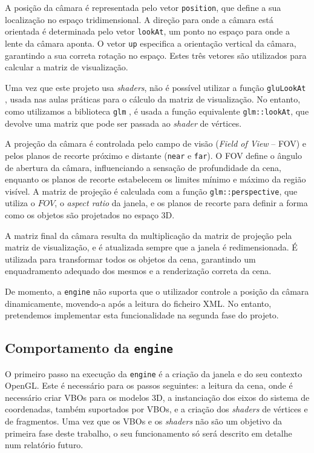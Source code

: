 \documentclass[12pt, a4paper]{article}
\begin{document}
A posição da câmara é representada pelo vetor \texttt{position}, que define a sua localização no
espaço tridimensional. A direção para onde a câmara está orientada é determinada pelo vetor
\texttt{lookAt}, um ponto no espaço para onde a lente da câmara aponta. O vetor \texttt{up}
especifica a orientação vertical da câmara, garantindo a sua correta rotação no espaço. Estes três
vetores são utilizados para calcular a matriz de visualização.

Uma vez que este projeto usa \emph{shaders}, não é possível utilizar a função \texttt{gluLookAt}
\cite{gluLookAt}, usada nas aulas práticas para o cálculo da matriz de visualização. No entanto,
como utilizamos a biblioteca \texttt{glm} \cite{glm}, é usada a função equivalente
\texttt{glm::lookAt}, que devolve uma matriz que pode ser passada ao \emph{shader} de vértices.

A projeção da câmara é controlada pelo campo de visão (\emph{Field of View} -- FOV) e pelos planos
de recorte próximo e distante (\texttt{near} e \texttt{far}). O FOV define o ângulo de abertura da
câmara, influenciando a sensação de profundidade da cena, enquanto os planos de recorte estabelecem
os limites mínimo e máximo da região visível. A matriz de projeção é calculada com a função
\texttt{glm::perspective}, que utiliza o $FOV$, o \emph{aspect ratio} da janela, e os planos de
recorte para definir a forma como os objetos são projetados no espaço 3D.

A matriz final da câmara resulta da multiplicação da matriz de projeção pela matriz de visualização,
e é atualizada sempre que a janela é redimensionada. É utilizada para transformar todos os objetos
da cena, garantindo um enquadramento adequado dos mesmos e a renderização correta da cena.

De momento, a \texttt{engine} não suporta que o utilizador controle a posição da câmara
dinamicamente, movendo-a após a leitura do ficheiro XML. No entanto, pretendemos implementar esta
funcionalidade na segunda fase do projeto.

\subsection{Comportamento da \texttt{engine}}

O primeiro passo na execução da \texttt{engine} é a criação da janela e do seu contexto OpenGL. Este
é necessário para os passos seguintes: a leitura da cena, onde é necessário criar VBOs para os
modelos 3D, a instanciação dos eixos do sistema de coordenadas, também suportados por VBOs, e a
criação dos \emph{shaders} de vértices e de fragmentos. Uma vez que os VBOs e os \emph{shaders} não
são um objetivo da primeira fase deste trabalho, o seu funcionamento só será descrito em detalhe num
relatório futuro.
\end{document}

